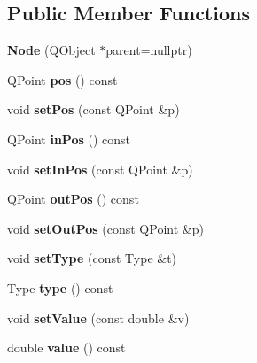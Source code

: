 \subsection*{Public Member Functions}
\begin{DoxyCompactItemize}
\item 
\mbox{\label{classNode_a96f101eb67925097d69051a242b8e5a7}} 
{\bfseries Node} (Q\+Object $\ast$parent=nullptr)
\item 
\mbox{\label{classNode_a16da82741d426eed77c481ab13a2fb7c}} 
Q\+Point {\bfseries pos} () const
\item 
\mbox{\label{classNode_a31619f2d1580d4c97d1c454c04a3ce7e}} 
void {\bfseries set\+Pos} (const Q\+Point \&p)
\item 
\mbox{\label{classNode_a7f2ad8fdb2afa9c0369c35a2270d93f1}} 
Q\+Point {\bfseries in\+Pos} () const
\item 
\mbox{\label{classNode_aa34d51c11117d2e01e707f84d7c5c2a0}} 
void {\bfseries set\+In\+Pos} (const Q\+Point \&p)
\item 
\mbox{\label{classNode_a1caba8cbccfaf15e73ffe620e3e293fc}} 
Q\+Point {\bfseries out\+Pos} () const
\item 
\mbox{\label{classNode_aa5db2e2bc6aef41e31f1977d9b487c1c}} 
void {\bfseries set\+Out\+Pos} (const Q\+Point \&p)
\item 
\mbox{\label{classNode_a347703417d88a057b631fb88e6251fe7}} 
void {\bfseries set\+Type} (const Type \&t)
\item 
\mbox{\label{classNode_a2cd393eb2422071ed2af7e026e61c7cb}} 
Type {\bfseries type} () const
\item 
\mbox{\label{classNode_a05a2a996157abda66ef7da3baf2f5db3}} 
void {\bfseries set\+Value} (const double \&v)
\item 
\mbox{\label{classNode_a508e7ab9a2c9feed1ab311606e9e1b68}} 
double {\bfseries value} () const
\item 
\mbox{\label{classNode_a8c58d22a60a161c24f5668be303a11c5}} 

\end{DoxyCompactItemize}
